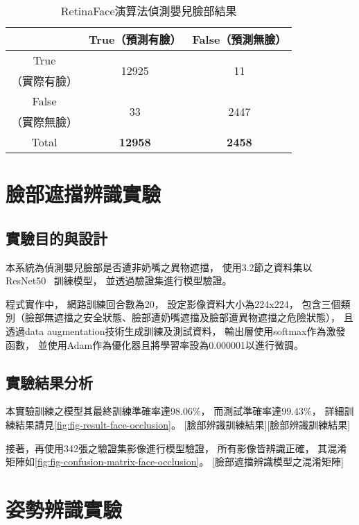 \documentclass[class=NCU_thesis, crop=false]{standalone}
\begin{document}
\begin{table}[h]
    \centering
    \caption{RetinaFace演算法偵測嬰兒臉部結果}
    \label{table:table-retinaface}
    \begin{tabular}{ccc}
    \hline
     & True（預測有臉）& False（預測無臉）\\
    \hline
    True & \multirow{2}{*}{12925} & \multirow{2}{*}{11} \\
    （實際有臉）& & \\
    False & \multirow{2}{*}{33} & \multirow{2}{*}{2447} \\
    （實際無臉）&  & \\
    \hline
    Total & \textbf{12958} & \textbf{2458} \\
    \hline
    \end{tabular}
\end{table}

\section{臉部遮擋辨識實驗}
\subsection{實驗目的與設計}
本系統為偵測嬰兒臉部是否遭非奶嘴之異物遮擋，
使用3.2節之資料集以ResNet50~\cite{he_deep_2016}
訓練模型，
並透過驗證集進行模型驗證。

程式實作中，
網路訓練回合數為20，
設定影像資料大小為224x224，
包含三個類別（臉部無遮擋之安全狀態、臉部遭奶嘴遮擋及臉部遭異物遮擋之危險狀態），
且透過data augmentation技術生成訓練及測試資料，
輸出層使用softmax作為激發函數，
並使用Adam作為優化器且將學習率設為0.000001以進行微調。

\subsection{實驗結果分析}
本實驗訓練之模型其最終訓練準確率達98.06\%，
而測試準確率達99.43\%，
詳細訓練結果請見\cref{fig:fig-result-face-occlusion}。
[臉部辨識訓練結果][臉部辨識訓練結果]

接著，再使用342張之驗證集影像進行模型驗證，
所有影像皆辨識正確，
其混淆矩陣如\cref{fig:fig-confusion-matrix-face-occlusion}。
[臉部遮擋辨識模型之混淆矩陣]

\section{姿勢辨識實驗}
\end{document}
